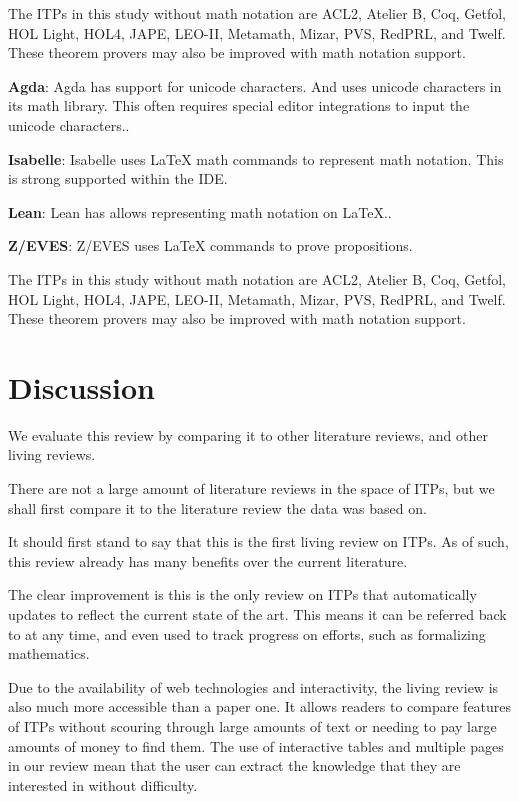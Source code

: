 \documentclass[
]{article}
\begin{document}
The ITPs in this study without math notation are ACL2, Atelier B, Coq,
Getfol, HOL Light, HOL4, JAPE, LEO-II, Metamath, Mizar, PVS, RedPRL, and
Twelf. These theorem provers may also be improved with math notation
support.

\textbf{Agda}: Agda has support for unicode characters. And uses unicode
characters in its math library. This often requires special editor
integrations to input the unicode characters..

\textbf{Isabelle}: Isabelle uses LaTeX math commands to represent math
notation. This is strong supported within the IDE.

\textbf{Lean}: Lean has allows representing math notation on LaTeX..

\textbf{Z/EVES}: Z/EVES uses LaTeX commands to prove propositions.

The ITPs in this study without math notation are ACL2, Atelier B, Coq,
Getfol, HOL Light, HOL4, JAPE, LEO-II, Metamath, Mizar, PVS, RedPRL, and
Twelf. These theorem provers may also be improved with math notation
support.

\hypertarget{discussion}{%
\section{Discussion}\label{discussion}}

We evaluate this review by comparing it to other literature reviews, and
other living reviews.

There are not a large amount of literature reviews in the space of ITPs,
but we shall first compare it to the literature review the data was
based on.

It should first stand to say that this is the first living review on
ITPs. As of such, this review already has many benefits over the current
literature.

The clear improvement is this is the only review on ITPs that
automatically updates to reflect the current state of the art. This
means it can be referred back to at any time, and even used to track
progress on efforts, such as formalizing mathematics.

Due to the availability of web technologies and interactivity, the
living review is also much more accessible than a paper one. It allows
readers to compare features of ITPs without scouring through large
amounts of text or needing to pay large amounts of money to find them.
The use of interactive tables and multiple pages in our review mean that
the user can extract the knowledge that they are interested in without
difficulty.
\end{document}
